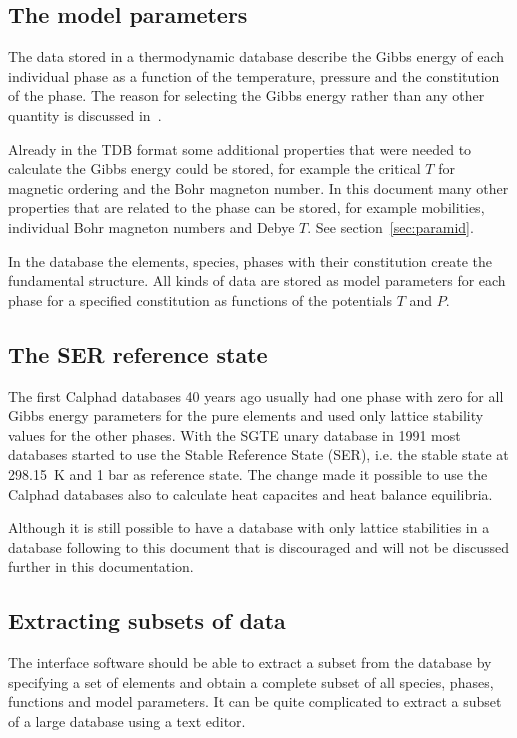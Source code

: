 \documentclass[12pt]{article}
\begin{document}
\subsection{The model parameters}

The data stored in a thermodynamic database describe the Gibbs energy
of each individual phase as a function of the temperature, pressure
and the constitution of the phase.  The reason for selecting the Gibbs
energy rather than any other quantity is discussed in~\cite{78Hil}.

Already in the TDB format some additional properties that were needed
to calculate the Gibbs energy could be stored, for example the
critical $T$ for magnetic ordering and the Bohr magneton number.  In
this document many other properties that are related to the phase can
be stored, for example mobilities, individual Bohr magneton numbers
and Debye $T$.  See section~\ref{sec:paramid}.

In the database the elements, species, phases with their constitution
create the fundamental structure.  All kinds of data are stored as
model parameters for each phase for a specified constitution as
functions of the potentials $T$ and $P$.

\subsection{The SER reference state}

The first Calphad databases 40 years ago usually had one phase with
zero for all Gibbs energy parameters for the pure elements and used
only lattice stability values for the other phases.  With the SGTE
unary database in 1991 most databases started to use the Stable
Reference State (SER), i.e. the stable state at 298.15~K and 1 bar as
reference state.  The change made it possible to use the Calphad
databases also to calculate heat capacites and heat balance
equilibria.

Although it is still possible to have a database with only lattice
stabilities in a database following to this document that is
discouraged and will not be discussed further in this documentation.

\subsection{Extracting subsets of data}

The interface software should be able to extract a subset from the
database by specifying a set of elements and obtain a complete subset
of all species, phases, functions and model parameters.  It can be
quite complicated to extract a subset of a large database using a text
editor.
\end{document}
